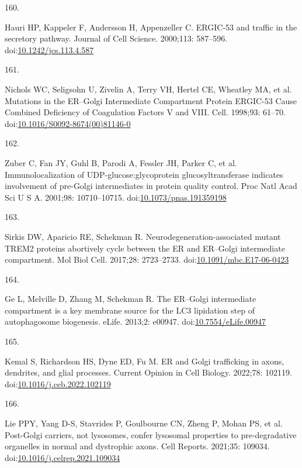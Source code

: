 \documentclass[
  12pt,
  a4paper,
]{book}
\newlength{\cslhangindent}
\newlength{\csllabelwidth}
\newenvironment{CSLReferences}[2] %
 {\begin{list}{}{%
  \setlength{\itemindent}{0pt}
  \setlength{\leftmargin}{0pt}
  \setlength{\parsep}{0pt}
  \ifodd #1
   \setlength{\leftmargin}{\cslhangindent}
   \setlength{\itemindent}{-1\cslhangindent}
  \fi
  \setlength{\itemsep}{#2\baselineskip}}}
 {\end{list}}
\newcommand{\CSLLeftMargin}[1]{\parbox[t]{\csllabelwidth}{\strut#1\strut}}
\newcommand{\CSLRightInline}[1]{\parbox[t]{\linewidth - \csllabelwidth}{\strut#1\strut}}
\begin{document}
\begin{CSLReferences}{0}{1}
\CSLLeftMargin{160. }%
\CSLRightInline{Hauri HP, Kappeler F, Andersson H, Appenzeller C. {ERGIC-53} and traffic in the secretory pathway. Journal of Cell Science. 2000;113: 587--596. doi:\href{https://doi.org/10.1242/jcs.113.4.587}{10.1242/jcs.113.4.587}}

\CSLLeftMargin{161. }%
\CSLRightInline{Nichols WC, Seligsohn U, Zivelin A, Terry VH, Hertel CE, Wheatley MA, et al. Mutations in the {ER}--{Golgi Intermediate Compartment Protein ERGIC-53 Cause Combined Deficiency} of {Coagulation Factors V} and {VIII}. Cell. 1998;93: 61--70. doi:\href{https://doi.org/10.1016/S0092-8674(00)81146-0}{10.1016/S0092-8674(00)81146-0}}

\CSLLeftMargin{162. }%
\CSLRightInline{Zuber C, Fan JY, Guhl B, Parodi A, Fessler JH, Parker C, et al. Immunolocalization of {UDP-glucose}:glycoprotein glucosyltransferase indicates involvement of pre-{Golgi} intermediates in protein quality control. Proc Natl Acad Sci U S A. 2001;98: 10710--10715. doi:\href{https://doi.org/10.1073/pnas.191359198}{10.1073/pnas.191359198}}

\CSLLeftMargin{163. }%
\CSLRightInline{Sirkis DW, Aparicio RE, Schekman R. Neurodegeneration-associated mutant {TREM2} proteins abortively cycle between the {ER} and {ER}--{Golgi} intermediate compartment. Mol Biol Cell. 2017;28: 2723--2733. doi:\href{https://doi.org/10.1091/mbc.E17-06-0423}{10.1091/mbc.E17-06-0423}}

\CSLLeftMargin{164. }%
\CSLRightInline{Ge L, Melville D, Zhang M, Schekman R. The {ER}--{Golgi} intermediate compartment is a key membrane source for the {LC3} lipidation step of autophagosome biogenesis. eLife. 2013;2: e00947. doi:\href{https://doi.org/10.7554/eLife.00947}{10.7554/eLife.00947}}

\CSLLeftMargin{165. }%
\CSLRightInline{Kemal S, Richardson HS, Dyne ED, Fu M. {ER} and {Golgi} trafficking in axons, dendrites, and glial processes. Current Opinion in Cell Biology. 2022;78: 102119. doi:\href{https://doi.org/10.1016/j.ceb.2022.102119}{10.1016/j.ceb.2022.102119}}

\CSLLeftMargin{166. }%
\CSLRightInline{Lie PPY, Yang D-S, Stavrides P, Goulbourne CN, Zheng P, Mohan PS, et al. Post-{Golgi} carriers, not lysosomes, confer lysosomal properties to pre-degradative organelles in normal and dystrophic axons. Cell Reports. 2021;35: 109034. doi:\href{https://doi.org/10.1016/j.celrep.2021.109034}{10.1016/j.celrep.2021.109034}}


\end{CSLReferences}
\end{document}
